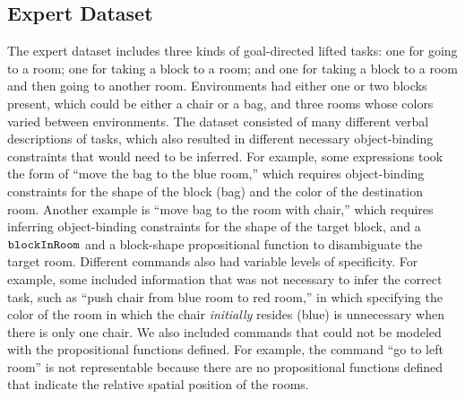 \documentclass[conference]{IEEEtran}
\begin{document}


\subsection{Expert Dataset}
The expert dataset includes three kinds of goal-directed lifted tasks: one for going to a room; one for taking a block to a room; and one for taking a block to a room and then going to another room. Environments had either one or two blocks present, which could be either a chair or a bag, and three rooms whose colors varied between environments. The dataset consisted of many different verbal descriptions of tasks, which also resulted in different necessary object-binding constraints that would need to be inferred. For example, some expressions took the form of ``move the bag to the blue room,'' which requires object-binding constraints for the shape of the block (bag) and the color of the destination room. Another example is ``move bag to the room with chair,'' which requires inferring object-binding constraints for the shape of the target block, and a ${\tt blockInRoom}$ and a block-shape propositional function to disambiguate the target room. Different commands also had variable levels of specificity. For example, some included information that was not necessary to infer the correct task, such as ``push chair from blue room to red room,'' in which specifying the color of the room in which the chair {\em initially} resides (blue) is unnecessary when there is only one chair. We also included commands that could not be modeled with the propositional functions defined. For example, the command ``go to left room'' is not representable because there are no propositional functions defined that indicate the relative spatial position of the rooms.%
\end{document}
